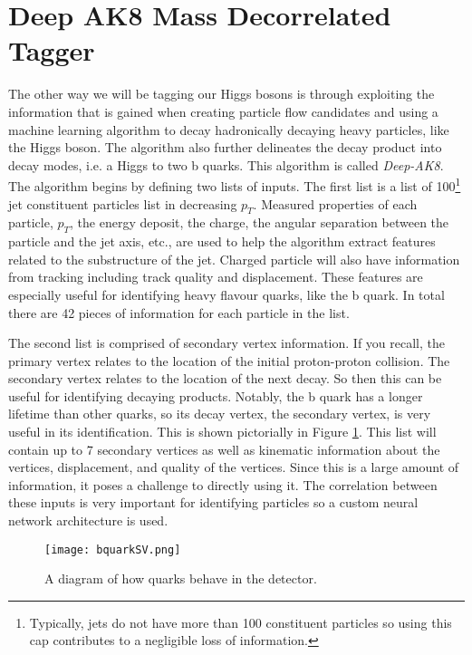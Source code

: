 \section{Deep AK8 Mass Decorrelated Tagger}

The other way we will be tagging our Higgs bosons is through exploiting the information that is gained when creating particle flow candidates and using a machine learning algorithm to decay hadronically decaying heavy particles, like the Higgs boson.
The algorithm also further delineates the decay product into decay modes, i.e. a Higgs to two b quarks. This algorithm is called \textit{Deep-AK8}.
The algorithm begins by defining two lists of inputs. The first list is a list of 100\footnote{Typically, jets do not have more than 100 constituent particles so using this cap contributes to a negligible loss of information.} jet constituent particles list in decreasing $p_T$.
Measured properties of each particle, $p_T$, the energy deposit, the charge, the angular separation between the particle and the
jet axis, etc., are used to help the algorithm extract features related to the substructure of the jet.
Charged particle will also have information from tracking including track quality and displacement.
These features are especially useful for identifying heavy flavour quarks, like the b quark. In total there are 42 pieces of information for each particle in the list.

The second list is comprised of secondary vertex information. If you recall, the primary vertex relates to the location of the initial proton-proton collision.
The secondary vertex relates to the location of the next decay. So then this can be useful for identifying decaying products.
Notably, the b quark has a longer lifetime than other quarks, so its decay vertex, the secondary vertex, is very useful in its identification. This is shown pictorially in Figure \ref{fig:fig_4-1}.
This list will contain up to 7 secondary vertices as well as kinematic information about the vertices, displacement, and quality of the vertices.
Since this is a large amount of information, it poses a challenge to directly using it. The correlation between these inputs is very important for identifying particles so a custom neural network architecture is used.

\begin{figure} %
    \centering
    \texttt{[image: bquarkSV.png]}
    \caption{A diagram of how quarks behave in the detector.}
    \label{fig:fig_4-1}
 \end{figure}

